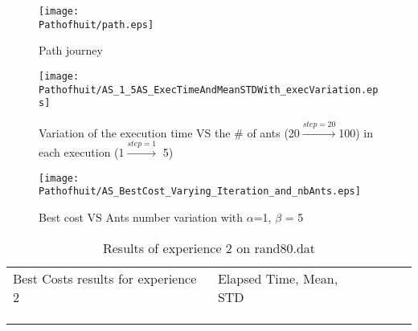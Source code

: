 \begin{figure}[H]
		\begin{minipage}[t]{0.45\linewidth}
		\centering
		\texttt{[image: \\Pathofhuit/path.eps]}
		\caption{Path journey}\label{fig:Pathofhuit:path}
		
		\end{minipage}\hfill
		\begin{minipage}[t]{0.45\linewidth}
		\centering
		\texttt{[image: \\Pathofhuit/AS\_1\_5AS\_ExecTimeAndMeanSTDWith\_execVariation.eps]}
		\caption{Variation of the execution time VS the \# of ants (20$\stackrel{step=20}{\rightarrow}$100) in each execution (1$\stackrel{step=1}{\rightarrow}$ 5)}
		\label{fig:Pathofhuit:AS_1_5AS_ExecTimeAndMeanSTDWith_execVariation}
		\end{minipage}
	\flushleft
		\begin{minipage}[t]{0.45\linewidth}
		\centering
		\texttt{[image: \\Pathofhuit/AS\_BestCost\_Varying\_Iteration\_and\_nbAnts.eps]}
		\caption{Best cost VS Ants number variation with $\alpha$=1, $ \beta $ = 5}
		\label{fig:Pathofhuit:AS_BestCost_Varying_Iteration_and_nbAnts}
		\end{minipage}
	\end{figure}\flushright
		\begin{minipage}[t]{0.9\linewidth}
		\vspace{-9mm}
		\begin{table}[H]
		\label{tab:Pathofhuit:expdeux}
		\begin{tabular}{lllll}
		\cline{1-2}
		\multicolumn{1}{|l|}{Best Costs results for experience 2}                                                           &  \multicolumn{1}{l|}{Elapsed Time, Mean, STD}                                             &  &  &  \\ \cline{1-2}
		\multicolumn{1}{|l|}{} & \multicolumn{1}{l|}{ } &  &  &  \\ \cline{1-2}
																						  &                                                                     &  &  &  \\
																						  &                                                                     &  &  & 
		\end{tabular}
		\caption{Results of experience 2 on rand80.dat}
		\end{table}
		\end{minipage}	

